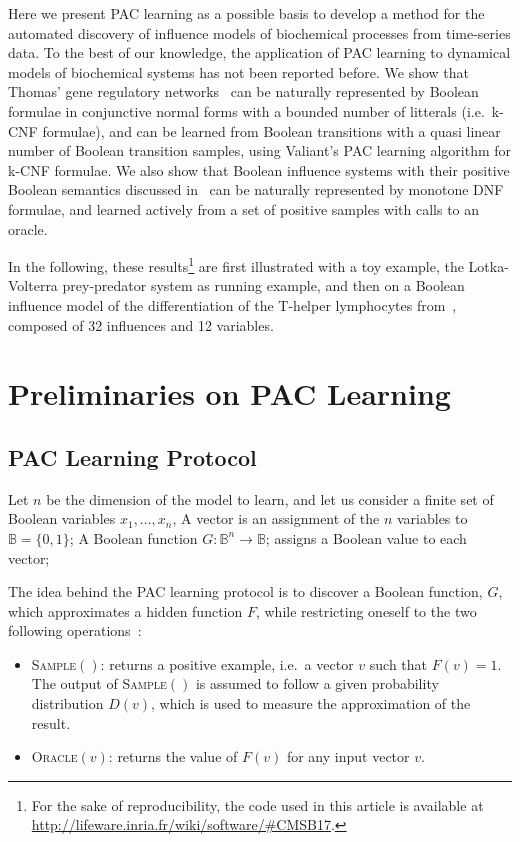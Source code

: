 \documentclass{llncs}
\begin{document}
Here we present PAC learning as a possible basis to develop a method for the automated discovery of influence models of biochemical processes from time-series data. 
To the best of our knowledge, 
the application of PAC learning to dynamical models of biochemical systems has not been reported before.
We show that Thomas' gene regulatory networks~\cite{Thomas91jtb,Thomas73jtb} can be naturally represented by 
Boolean formulae in conjunctive normal forms with a bounded number of litterals (i.e.~k-CNF formulae),
and can be learned from Boolean transitions with a quasi linear number of Boolean transition samples, using Valiant's PAC learning algorithm for k-CNF formulae.
We also show that Boolean influence systems with their positive Boolean semantics discussed in~\cite{FMRS16cmsb}
can be naturally represented by monotone DNF formulae,
and learned actively from a set of positive samples with calls to an oracle.

In the following, these results\footnote{For the sake of reproducibility, the code used in this article is available at \url{http://lifeware.inria.fr/wiki/software/\#CMSB17}.} are first illustrated with a toy example, the Lotka-Volterra prey-predator system as running example,
and then on a Boolean influence model of 
the differentiation of the T-helper lymphocytes from~\cite{RRMTC06tcsb,Mendoza06biosystems},
composed of 32 influences and 12 variables.


\section{Preliminaries on PAC Learning}\label{pac}

\subsection{PAC Learning Protocol}

Let $n$ be the dimension of the model to learn, and let us consider a finite set of Boolean variables $x_1,\ldots,x_n$,
 A vector is an assignment of the $n$ variables to  $\mathbb{B} = \{0,1\}$;
 A Boolean function $G:{\mathbb{B}}^n \rightarrow \mathbb{B}$;
	assigns a Boolean value to each vector;


The idea behind the PAC learning protocol is to discover a Boolean function, $G$, which approximates a hidden function $F$, while restricting oneself to the two following operations~:
\begin{itemize}
  \item
\textsc{Sample}$()$: returns a positive example, i.e.~a vector $v$ such that $F(v)=1$.
The output of \textsc{Sample}$()$ is assumed to follow a given probability distribution $D(v)$, which is used to measure the approximation of the result.
  \item
\textsc{Oracle}$(v)$: returns the value of $F(v)$ for any input vector $v$.
\end{itemize}
\end{document}
